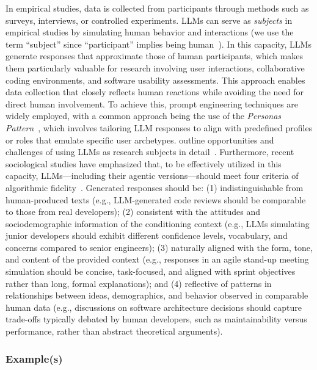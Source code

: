 In empirical studies, data is collected from participants through methods such as surveys, interviews, or controlled experiments.
LLMs can serve as \emph{subjects} in empirical studies by simulating human behavior and interactions (we use the term ``subject'' since ``participant'' implies being human~\cite{apa-dict-subject}).
In this capacity, LLMs generate responses that approximate those of human participants, which makes them particularly valuable for research involving user interactions, collaborative coding environments, and software usability assessments.
This approach enables data collection that closely reflects human reactions while avoiding the need for direct human involvement.
To achieve this, prompt engineering techniques are widely employed, with a common approach being the use of the \textit{Personas Pattern}~\cite{DBLP:journals/corr/abs-2308-07702}, which involves tailoring LLM responses to align with predefined profiles or roles that emulate specific user archetypes.
\citeauthor{ZHAO2025101167} outline opportunities and challenges of using LLMs as research subjects in detail~\cite{ZHAO2025101167}.
Furthermore, recent sociological studies have emphasized that, to be effectively utilized in this capacity, LLMs---including their agentic versions---should meet four criteria of algorithmic fidelity~\cite{DBLP:journals/corr/abs-2209-06899}.
Generated responses should be: (1) indistinguishable from human-produced texts (e.g., LLM-generated code reviews should be comparable to those from real developers); (2) consistent with the attitudes and sociodemographic information of the conditioning context (e.g., LLMs simulating junior developers should exhibit different confidence levels, vocabulary, and concerns compared to senior engineers); (3) naturally aligned with the form, tone, and content of the provided context (e.g., responses in an agile stand-up meeting simulation should be concise, task-focused, and aligned with sprint objectives rather than long, formal explanations); and (4) reflective of patterns in relationships between ideas, demographics, and behavior observed in comparable human data (e.g., discussions on software architecture decisions should capture trade-offs typically debated by human developers, such as maintainability versus performance, rather than abstract theoretical arguments).

\subsubsection{Example(s)}

